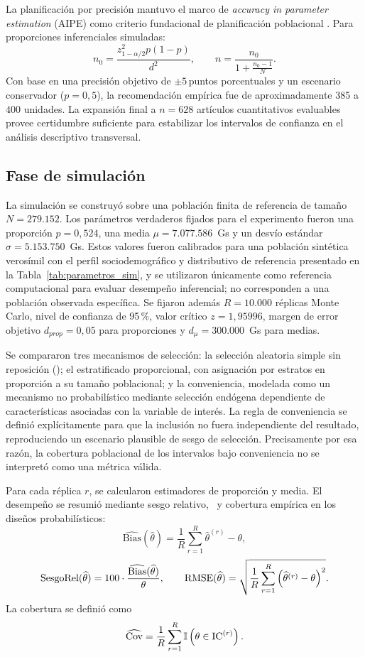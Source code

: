 La planificación por precisión mantuvo el marco de \textit{accuracy in parameter estimation} (AIPE) como criterio fundacional de planificación poblacional \citep{noordzij2010}. Para proporciones inferenciales simuladas:
\[
n_0=\frac{z_{1-\alpha/2}^2 p(1-p)}{d^2}, \qquad n=\frac{n_0}{1+\frac{n_0-1}{N}}.
\]
Con base en una precisión objetivo de $\pm 5$\,puntos porcentuales y un escenario conservador ($p=0{,}5$), la recomendación empírica fue de aproximadamente 385 a $400$ unidades. La expansión final a $n=628$ artículos cuantitativos evaluables provee certidumbre suficiente para estabilizar los intervalos de confianza en el análisis descriptivo transversal.

\subsection{Fase de simulación}

La simulación se construyó sobre una población finita de referencia de tamaño $N=279.152$. Los parámetros verdaderos fijados para el experimento fueron una proporción $p=0{,}524$, una media $\mu=7.077.586$~Gs y un desvío estándar $\sigma=5.153.750$~Gs. Estos valores fueron calibrados para una población sintética verosímil con el perfil sociodemográfico y distributivo de referencia presentado en la Tabla~\ref{tab:parametros_sim}, y se utilizaron únicamente como referencia computacional para evaluar desempeño inferencial; no corresponden a una población observada específica. Se fijaron además $R=10.000$ réplicas Monte Carlo, nivel de confianza de 95\,\%, valor crítico $z=1{,}95996$, margen de error objetivo $d_{prop}=0{,}05$ para proporciones y $d_{\mu}=300.000$~Gs para medias.

Se compararon tres mecanismos de selección: la selección aleatoria simple sin reposición (\SRS); el estratificado proporcional, con asignación por estratos en proporción a su tamaño poblacional; y la conveniencia, modelada como un mecanismo no probabilístico mediante selección endógena dependiente de características asociadas con la variable de interés. La regla de conveniencia se definió explícitamente para que la inclusión no fuera independiente del resultado, reproduciendo un escenario plausible de sesgo de selección. Precisamente por esa razón, la cobertura poblacional de los intervalos bajo conveniencia no se interpretó como una métrica válida.

Para cada réplica $r$, se calcularon estimadores de proporción y media. El desempeño se resumió mediante sesgo relativo, \RMSE\ y cobertura empírica en los diseños probabilísticos:
\[
\widehat{\mathrm{Bias}}(\widehat{\theta})=\frac{1}{R}\sum_{r=1}^{R}\widehat{\theta}^{(r)}-\theta,
\]
\[
\mathrm{SesgoRel}(\widehat{\theta})=
100\cdot\frac{\widehat{\mathrm{Bias}}(\widehat{\theta})}{\theta},
\qquad
\mathrm{RMSE}(\widehat{\theta})=
\sqrt{\frac{1}{R}\sum_{r=1}^{R}\left(\widehat{\theta}^{(r)}-\theta\right)^2}.
\]
La cobertura se definió como
\[
\widehat{\mathrm{Cov}}=\frac{1}{R}\sum_{r=1}^{R}\mathbb{I}\left(\theta\in \text{IC}^{(r)}\right).
\]

